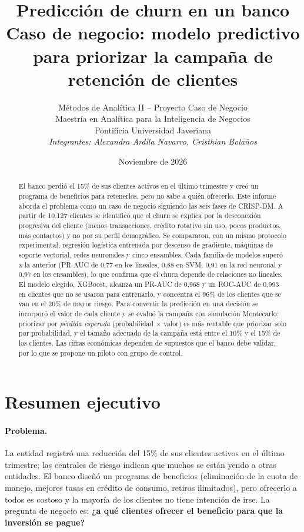 \documentclass[11pt,a4paper]{article}
\title{\textbf{Predicción de churn en un banco}\\[4pt]
\large Caso de negocio: modelo predictivo para priorizar la campaña de retención de clientes}
\author{Métodos de Analítica II -- Proyecto Caso de Negocio\\
Maestría en Analítica para la Inteligencia de Negocios\\
Pontificia Universidad Javeriana\\[8pt]
\textit{Integrantes: Alexandra Ardila Navarro, Cristhian Bolaños}}
\date{Noviembre de 2026}
\begin{document}
\maketitle
\thispagestyle{empty}

\begin{abstract}
\noindent El banco perdió el 15\% de sus clientes activos en el último trimestre y creó un programa de beneficios para retenerlos, pero no sabe a quién ofrecerlo. Este informe aborda el problema como un caso de negocio siguiendo las seis fases de CRISP-DM. A partir de 10.127 clientes se identificó que el churn se explica por la desconexión progresiva del cliente (menos transacciones, crédito rotativo sin uso, pocos productos, más contactos) y no por su perfil demográfico. Se compararon, con un mismo protocolo experimental, regresión logística entrenada por descenso de gradiente, máquinas de soporte vectorial, redes neuronales y cinco ensambles. Cada familia de modelos superó a la anterior (PR-AUC de 0,77 en los lineales, 0,88 en SVM, 0,91 en la red neuronal y 0,97 en los ensambles), lo que confirma que el churn depende de relaciones no lineales. El modelo elegido, XGBoost, alcanza un PR-AUC de 0,968 y un ROC-AUC de 0,993 en clientes que no se usaron para entrenarlo, y concentra el 96\% de los clientes que se van en el 20\% de mayor riesgo. Para convertir la predicción en una decisión se incorporó el valor de cada cliente y se evaluó la campaña con simulación Montecarlo: priorizar por \emph{pérdida esperada} (probabilidad $\times$ valor) es más rentable que priorizar solo por probabilidad, y el tamaño adecuado de la campaña está entre el 10\% y el 15\% de los clientes. Las cifras económicas dependen de supuestos que el banco debe validar, por lo que se propone un piloto con grupo de control.
\end{abstract}

\tableofcontents
\newpage

\section*{Resumen ejecutivo}

\paragraph{Problema.} La entidad registró una reducción del 15\% de sus clientes activos en el último trimestre; las centrales de riesgo indican que muchos se están yendo a otras entidades. El banco diseñó un programa de beneficios (eliminación de la cuota de manejo, mejores tasas en crédito de consumo, retiros ilimitados), pero ofrecerlo a todos es costoso y la mayoría de los clientes no tiene intención de irse. La pregunta de negocio es: \textbf{¿a qué clientes ofrecer el beneficio para que la inversión se pague?}
\end{document}
